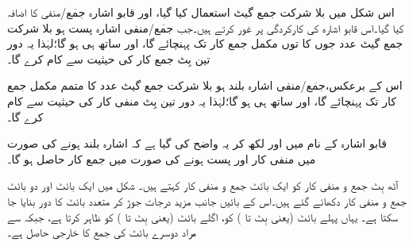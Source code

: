اس شکل میں  بلا شرکت جمع گیٹ  استعمال کیا گیا،  اور  قابو اشارہ   {{$\overline{\text{جمع}}$}/منفی} کا اضافہ کیا گیا۔اس  قابو اشارہ  کی کارکردگی پر غور کرتے ہیں۔جب {{$\overline{\text{جمع}}$}/منفی} اشارہ   پست  ہو بلا شرکت جمع گیٹ عدد    جوں کا توں مکمل جمع کار تک پہنچائے گا، اور ساتھ  ہی ہو گا؛لہٰذا یہ دور  تین بِٹ جمع کار کی حیثیت سے کام کرے گا۔

اس کے برعکس،{{$\overline{\text{جمع}}$}/منفی} اشارہ    بلند   ہو بلا شرکت جمع گیٹ عدد    کا متمم  مکمل جمع کار تک پہنچائے گا، اور ساتھ  ہی ہو گا؛لہٰذا یہ دور  تین بِٹ  منفی  کار کی حیثیت سے کام کرے گا۔
	
قابو اشارہ کے نام میں   اور   لکھ کر یہ واضح کی گیا  ہے کہ اشارہ بلند ہونے کی صورت میں منفی کار اور پست ہونے کی صورت میں جمع کار حاصل ہو گا۔

	
آٹھ بِٹ جمع و منفی  کار کو ایک بائٹ جمع و منفی کار کہتے ہیں۔  شکل  میں  ایک بائٹ   اور دو بائٹ  جمع  و منفی کار  دکھائے گئے ہیں۔اس کے بائیں جانب  مزید درجات جوڑ کر متعدد بائٹ کا دور بنایا جا سکتا ہے۔ یہاں   پہلے  بائٹ (یعنی بِٹ  تا )  کو،      اگلے    بائٹ (یعنی بِٹ  تا )  کو ظاہر کرتا ہے، جبکہ  سے مراد دوسرے بائٹ  کی جمع کا   خارجی حاصل   ہے۔

